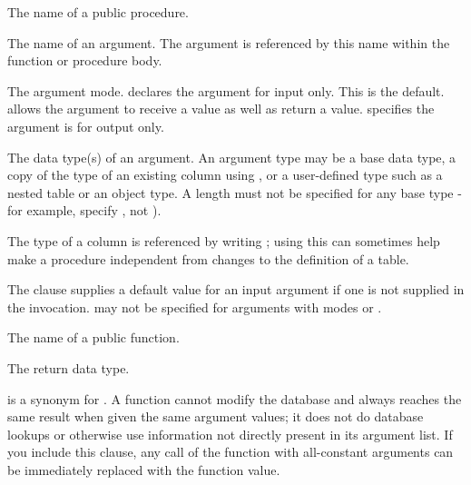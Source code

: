 \documentclass[letterpaper,10pt,english,openany,oneside]{sphinxmanual}
\begin{document}

The name of a public procedure.


The name of an argument. The argument is referenced by this name within
the function or procedure body.


The argument mode.  declares the argument for input only. This is the
default.  allows the argument to receive a value as well as return
a value.  specifies the argument is for output only.


The data type(s) of an argument. An argument type may be a base data
type, a copy of the type of an existing column using , or a
user-defined type such as a nested table or an object type. A length
must not be specified for any base type - for example, specify ,
not ).

The type of a column is referenced by writing  ;
using this can sometimes help make a procedure independent from changes to the definition of a table.


The  clause supplies a default value for an input argument if one
is not supplied in the invocation.  may not be specified for
arguments with modes  or .

\newpage


The name of a public function.


The return data type.


 is a synonym for . A  function
cannot modify the database and always reaches the same result when given
the same argument values; it does not do database lookups or otherwise
use information not directly present in its argument list. If you
include this clause, any call of the function with all-constant
arguments can be immediately replaced with the function value.
\end{document}

